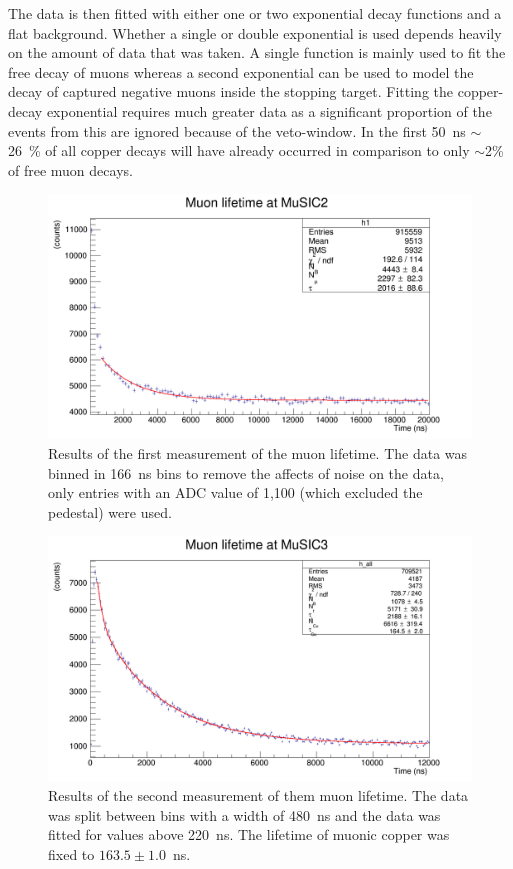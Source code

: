 The data is then fitted with either one or two exponential decay functions and a flat background. Whether a single or double exponential is used depends heavily on the amount of data that was taken. A single function is mainly used to fit the free decay of muons whereas a second exponential can be used to model the decay of captured negative muons inside the stopping target. Fitting the copper-decay exponential requires much greater data as a significant proportion of the events from this are ignored because of the veto-window. In the first 50~ns \(\sim\)26~\% of all copper decays will have already occurred in comparison to only \(\sim\)2\% of free muon decays. 

\begin{figure}[hptb]
  \centering
  \includegraphics[width=.9\textwidth]{images/lifetime/music2_mu_lifetime_good.png}
  \caption{Results of the first measurement of the muon lifetime. The data was binned in 166~ns bins to remove the affects of noise on the data, only entries with an ADC value of 1,100 (which excluded the pedestal) were used.}
  \label{fig:music2_mu_lifetime}
\end{figure}
\begin{figure}[hptb]
  \centering
  \includegraphics[width=.9\textwidth]{images/lifetime/music3_muon_lifetime.png}
  \caption{Results of the second measurement of them muon lifetime. The data was split between bins with a width of 480~ns and the data was fitted for values above 220~ns. The lifetime of muonic copper was fixed to \( 163.5\pm1.0 \)~ns.}
  \label{fig:music3_muon_lifetime}
\end{figure}


